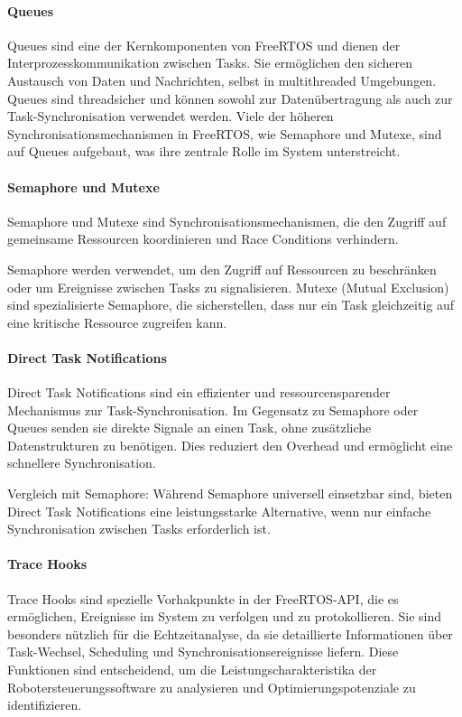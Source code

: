 \paragraph{Queues}

Queues sind eine der Kernkomponenten von FreeRTOS und dienen der
Interprozesskommunikation zwischen Tasks. Sie ermöglichen den sicheren Austausch
von Daten und Nachrichten, selbst in multithreaded Umgebungen. Queues sind
threadsicher und können sowohl zur Datenübertragung als auch zur
Task-Synchronisation verwendet werden. Viele der höheren
Synchronisationsmechanismen in FreeRTOS, wie Semaphore und Mutexe, sind auf
Queues aufgebaut, was ihre zentrale Rolle im System unterstreicht.


\paragraph{Semaphore und Mutexe}

Semaphore und Mutexe sind Synchronisationsmechanismen, die den Zugriff auf
gemeinsame Ressourcen koordinieren und Race Conditions verhindern.

Semaphore werden verwendet, um den Zugriff auf Ressourcen zu beschränken oder um
Ereignisse zwischen Tasks zu signalisieren. Mutexe (Mutual Exclusion) sind
spezialisierte Semaphore, die sicherstellen, dass nur ein Task gleichzeitig auf
eine kritische Ressource zugreifen kann.

\paragraph{Direct Task Notifications}

Direct Task Notifications sind ein effizienter und ressourcensparender
Mechanismus zur Task-Synchronisation. Im Gegensatz zu Semaphore oder Queues
senden sie direkte Signale an einen Task, ohne zusätzliche Datenstrukturen zu
benötigen. Dies reduziert den Overhead und ermöglicht eine schnellere
Synchronisation.

Vergleich mit Semaphore: Während Semaphore universell einsetzbar sind, bieten
Direct Task Notifications eine leistungsstarke Alternative, wenn nur einfache
Synchronisation zwischen Tasks erforderlich ist.

\paragraph{Trace Hooks}

Trace Hooks sind spezielle Vorhakpunkte in der FreeRTOS-API, die es ermöglichen,
Ereignisse im System zu verfolgen und zu protokollieren. Sie sind besonders
nützlich für die Echtzeitanalyse, da sie detaillierte Informationen über
Task-Wechsel, Scheduling und Synchronisationsereignisse liefern. Diese
Funktionen sind entscheidend, um die Leistungscharakteristika der
Robotersteuerungssoftware zu analysieren und Optimierungspotenziale zu
identifizieren.


